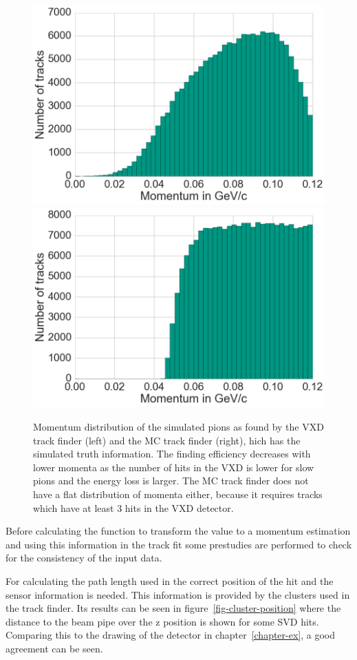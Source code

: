 \begin{figure}
 \centering
 \includegraphics[width=0.48\linewidth]{figures/vxd/finding_efficiency.png}
 \includegraphics[width=0.48\linewidth]{figures/vxd/finding_efficiency_mc.png}
 \caption[Momentum distribution of the found and simulated pions.]{Momentum distribution of the simulated pions as found by the VXD track finder (left) and the MC track finder (right), hich has the simulated truth information. The finding efficiency decreases with lower momenta as the number of hits in the VXD is lower for slow pions and the energy loss is larger. The MC track finder does not have a flat distribution of momenta either, because it requires tracks which have at least 3 hits in the VXD detector.}
 \label{fig-vxd-finding-efficiency}
\end{figure}

Before calculating the function to transform the \dedx value to a momentum estimation and using this information in the track fit some prestudies are performed to check for the consistency of the input data.

For calculating the path length used in \dedx the correct position of the hit and the sensor information is needed. This information is provided by the clusters used in the track finder. Its results can be seen in figure~\ref{fig-cluster-position} where the distance to the beam pipe over the z position is shown for some SVD hits. Comparing this to the drawing of the detector in chapter~\ref{chapter-ex}, a good agreement can be seen.

